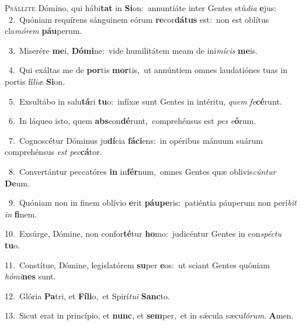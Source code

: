 \lettrine{\initial\textcolor{\initialcolor}{P}}{sállite} Dómino, qui hábi\textbf{tat} in \textbf{Si}\-on:~\star annuntiáte inter Gentes stú\-\textit{di}\-\textit{a} \textbf{e}\-jus:\\
{\numbfont\textcolor{\numbcolor}{~2.}}~Quóniam requírens sánguinem eórum \textbf{re}\-cor\-\textbf{dá}\-\textbf{tus} est:~\star non est oblítus cla\-\textit{mó}\-\textit{rem} \textbf{páu}\-perum.\par
{\numbfont\textcolor{\numbcolor}{~3.}}~Miserére \textbf{me}\-i, \textbf{Dó}\-\textbf{mi}ne:~\star vide humilitátem meam de ini\-\textit{mí}\-\textit{cis} \textbf{me}\-is.\par
{\numbfont\textcolor{\numbcolor}{~4.}}~Qui exáltas me de \textbf{por}\-tis \textbf{mor}\-tis,~\star ut annúntiem omnes laudatiónes tuas in portis fí\-\textit{li}\-\textit{æ} \textbf{Si}\-on.\par
{\numbfont\textcolor{\numbcolor}{~5.}}~Exsultábo in salu\-\textbf{tá}\-ri \textbf{tu}\-o:~\star infíxæ sunt Gentes in intéritu, \textit{quem} \textit{fe}\-\textbf{cé}runt.\par
{\numbfont\textcolor{\numbcolor}{~6.}}~In láqueo isto, quem \textbf{abs}\-con\-\textbf{dé}\-runt,~\star comprehénsus est \textit{pes} \textit{e}\-\textbf{ó}rum.\par
{\numbfont\textcolor{\numbcolor}{~7.}}~Cognoscétur Dóminus ju\-\textbf{dí}\-cia \textbf{fá}\-\textbf{ci}ens:~\star in opéribus mánuum suárum comprehénsus \textit{est} \textit{pec}\-\textbf{cá}tor.\par
{\numbfont\textcolor{\numbcolor}{~8.}}~Convertántur peccatóres \textbf{in} in\-\textbf{fér}\-num,~\star omnes Gentes quæ oblivis\-\textit{cún}\-\textit{tur} \textbf{De}\-um.\par
{\numbfont\textcolor{\numbcolor}{~9.}}~Quóniam non in finem oblívio \textbf{e}\-rit \textbf{páu}\-\textbf{pe}ris:~\star patiéntia páuperum non perí\textit{bit} \textit{in} \textbf{fi}\-nem.\par
{\numbfont\textcolor{\numbcolor}{10.}}~Exsúrge, Dómine, non confor\-\textbf{té}\-tur \textbf{ho}\-mo:~\star judicéntur Gentes in con\-\textit{spéc}\-\textit{tu} \textbf{tu}\-o.\par
{\numbfont\textcolor{\numbcolor}{11.}}~Constítue, Dómine, legislatórem \textbf{su}\-per \textbf{e}\-os:~\star ut sciant Gentes quóniam \textit{hó}\-\textit{mi}\textbf{nes} sunt.\par
{\numbfont\textcolor{\numbcolor}{12.}}~Glória \textbf{Pa}\-tri, et \textbf{Fí}\-\textbf{li}o,~\star et Spirí\-\textit{tu}\-\textit{i} \textbf{Sanc}\-to.\par
{\numbfont\textcolor{\numbcolor}{13.}}~Sicut erat in princípio, et \textbf{nunc}\-, et \textbf{sem}\-per,~\star et in sǽcula sæcu\-\textit{ló}\-\textit{rum}. \textbf{A}\-men.\par

